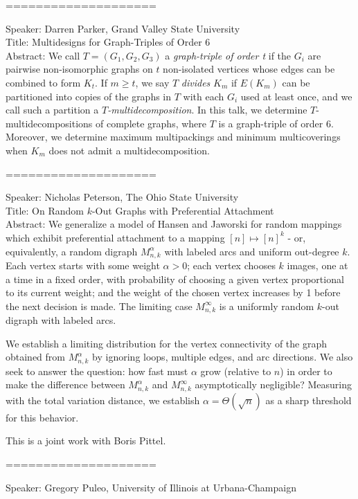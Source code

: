 \documentclass[11pt]{article}
\begin{document}
====================

Speaker: Darren Parker, Grand Valley State University\\
Title: Multidesigns for Graph-Triples of Order 6 \\
Abstract:  We call $T=(G_1,G_2,G_3)$ a \emph{graph-triple of order t} if the
$G_i$ are pairwise non-isomorphic graphs on $t$ non-isolated vertices whose
edges can be combined to form $K_t$.  If $m \geq t$, we say $T$
\emph{divides} $K_m$ if $E(K_m)$ can be partitioned into copies of the
graphs in $T$ with each $G_i$ used at least once, and we call such a
partition a \emph{$T$-multidecomposition}.  In this talk, we determine
$T$-multidecompositions of complete graphs, where $T$ is a graph-triple of
order 6. Moreover, we determine maximum multipackings and minimum
multicoverings when $K_m$ does not admit a multidecomposition. 

====================

Speaker: Nicholas Peterson, The Ohio State University\\
Title:  On Random $k$-Out Graphs with Preferential Attachment \\
Abstract:  We generalize a model of Hansen and Jaworski for random mappings
which exhibit preferential attachment to a mapping $[n]\mapsto[n]^k$ - or,
equivalently, a random digraph $M_{n,k}^{\alpha}$ with labeled arcs and
uniform out-degree $k$. Each vertex starts with some weight $\alpha>0$; each
vertex chooses $k$ images, one at a time in a fixed order, with probability
of choosing a given vertex proportional to its current weight; and the
weight of the chosen vertex increases by 1 before the next decision is made.
The limiting case $M_{n,k}^{\infty}$ is a uniformly random $k$-out digraph
with labeled arcs.

We establish a limiting distribution for the vertex connectivity of the
graph obtained from $M_{n,k}^{\alpha}$ by ignoring loops, multiple edges,
and arc directions. We also seek to answer the question: how fast must
$\alpha$ grow (relative to $n$) in order to make the difference between
$M_{n,k}^{\alpha}$ and $M_{n,k}^{\infty}$ asymptotically negligible?
Measuring with the total variation distance, we establish
$\alpha=\Theta(\sqrt{n})$ as a sharp threshold for this behavior.

This is a joint work with Boris Pittel. 

====================

Speaker: Gregory Puleo, University of Illinois at Urbana-Champaign\\
\end{document}
